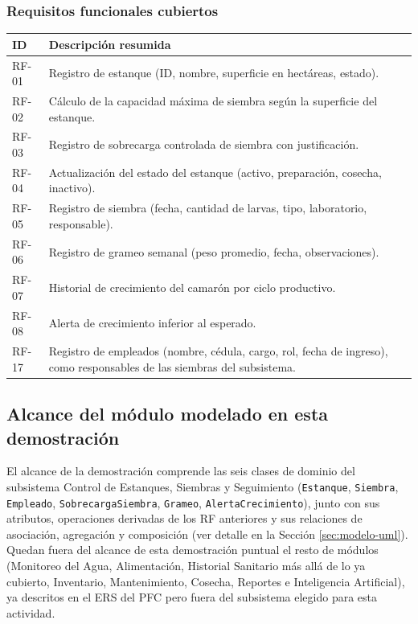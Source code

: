 \documentclass[11pt,a4paper]{article}
\begin{document}
\subsubsection{Requisitos funcionales cubiertos}
\begin{center}
\begin{tabularx}{\linewidth}{lX}
\toprule
\textbf{ID} & \textbf{Descripción resumida} \\
\midrule
RF-01 & Registro de estanque (ID, nombre, superficie en hectáreas, estado). \\
RF-02 & Cálculo de la capacidad máxima de siembra según la superficie del estanque. \\
RF-03 & Registro de sobrecarga controlada de siembra con justificación. \\
RF-04 & Actualización del estado del estanque (activo, preparación, cosecha,
inactivo). \\
RF-05 & Registro de siembra (fecha, cantidad de larvas, tipo, laboratorio,
responsable). \\
RF-06 & Registro de grameo semanal (peso promedio, fecha, observaciones). \\
RF-07 & Historial de crecimiento del camarón por ciclo productivo. \\
RF-08 & Alerta de crecimiento inferior al esperado. \\
RF-17 & Registro de empleados (nombre, cédula, cargo, rol, fecha de ingreso),
como responsables de las siembras del subsistema. \\
\bottomrule
\end{tabularx}
\end{center}

\subsection{Alcance del módulo modelado en esta demostración}
El alcance de la demostración comprende las seis clases de dominio del
subsistema Control de Estanques, Siembras y Seguimiento (\texttt{Estanque},
\texttt{Siembra}, \texttt{Empleado}, \texttt{SobrecargaSiembra},
\texttt{Grameo}, \texttt{AlertaCrecimiento}), junto con sus atributos,
operaciones derivadas de los RF anteriores y sus relaciones de asociación,
agregación y composición (ver detalle en la Sección \ref{sec:modelo-uml}).
Quedan fuera del alcance de esta demostración puntual el resto de módulos
(Monitoreo del Agua, Alimentación, Historial Sanitario más allá de lo ya
cubierto, Inventario, Mantenimiento, Cosecha, Reportes e Inteligencia
Artificial), ya descritos en el ERS del PFC pero fuera del subsistema elegido
para esta actividad.
\end{document}
